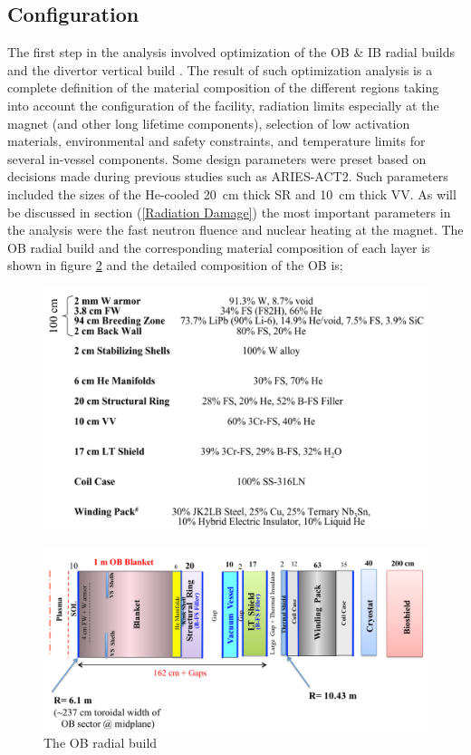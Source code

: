 \documentclass[12pt, letterpaper]{elsarticle}
\begin{document}
\subsection{Configuration} \label{Configuration}
The first step in the analysis involved optimization of the OB \& IB radial builds and the divertor vertical build \cite{ref_2}. The result of such optimization analysis is a complete definition of the material composition of the different regions taking into account the configuration of the facility, radiation limits especially at the magnet (and other long lifetime components), selection of low activation materials, environmental and safety constraints, and temperature limits for several in-vessel components. Some design parameters were preset based on decisions made during previous studies such as ARIES-ACT2. Such parameters included the sizes of the He-cooled \SI{20}{cm} thick SR and \SI{10}{cm} thick VV. As will be discussed in section (\ref{Radiation Damage}) the most important parameters in the analysis were the fast neutron fluence and nuclear heating at the magnet. The OB radial build and the corresponding material composition of each layer is shown in figure \ref{fig:OB_radial} and the detailed composition of the OB is;
\begin{figure}[h!]
  \centering
  \includegraphics[scale=0.2]{../plots/OB_comp.png}
  \label{fig:OB_comp}
\end{figure}
\begin{figure}[h!]
  \centering
  \includegraphics[scale=0.2]{../plots/OB_radial.png}
  \caption{The OB radial build}
  \label{fig:OB_radial}
\end{figure}
\end{document}
